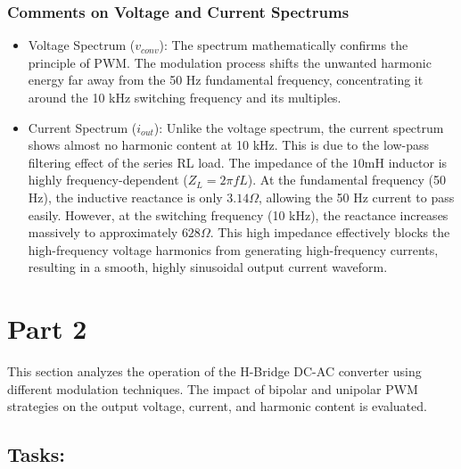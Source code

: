 \documentclass{article}
\begin{document}
\subsubsection{Comments on Voltage and Current Spectrums}
\begin{itemize}
    \item Voltage Spectrum ($v_{conv}$): The spectrum mathematically confirms the principle of PWM. The modulation process shifts the unwanted harmonic energy far away from the 50 Hz fundamental frequency, concentrating it around the 10 kHz switching frequency and its multiples.
\end{itemize}
\begin{itemize}
    \item Current Spectrum ($i_{out}$): Unlike the voltage spectrum, the current spectrum shows almost no harmonic content at 10 kHz. This is due to the low-pass filtering effect of the series RL load. The impedance of the $10\text{mH}$ inductor is highly frequency-dependent ($Z_L = 2\pi f L$). At the fundamental frequency (50 Hz), the inductive reactance is only $3.14\Omega$, allowing the 50 Hz current to pass easily. However, at the switching frequency (10 kHz), the reactance increases massively to approximately $628\Omega$. This high impedance effectively blocks the high-frequency voltage harmonics from generating high-frequency currents, resulting in a smooth, highly sinusoidal output current waveform.
\end{itemize}

\section{Part 2}
This section analyzes the operation of the H-Bridge DC-AC converter using different modulation techniques. The impact of bipolar and unipolar PWM strategies on the output voltage, current, and harmonic content is evaluated.
\subsection*{Tasks:}
\end{document}
